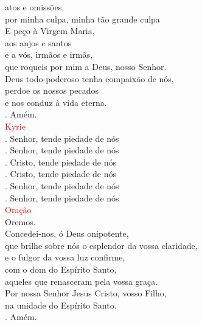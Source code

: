 \documentclass{book}
\begin{document}
\begin{flushleft}
    atos e omissões, \\
    por minha culpa, minha tão grande culpa \\
    E peço à Virgem Maria, \\
    aos anjos e santos \\
    e a vós, irmãos e irmãs, \\
    que roqueis por mim a Deus, nosso Senhor.
    \vspace{0.1cm} \\
    Deus todo-poderoso tenha compaixão de nós, \\
    perdoe os nossos pecados \\
    e nos conduz à vida eterna. \\
    {\color{red} \Rbar.} Amém.
    \vspace{0.2cm} \\
    \textcolor{red}{Kyrie}
    \vspace{0.2cm} \\
    {\color{red} \Vbar.} Senhor, tende piedade de nós \\
    {\color{red} \Rbar.} Senhor, tende piedade de nós
    \vspace{0.1cm} \\
    {\color{red} \Vbar.} Cristo, tende piedade de nós \\
    {\color{red} \Rbar.} Cristo, tende piedade de nós
    \vspace{0.1cm} \\
    {\color{red} \Vbar.} Senhor, tende piedade de nós \\
    {\color{red} \Rbar.} Senhor, tende piedade de nós
    \vspace{0.2cm} \\
    \textcolor{red}{Oração}
    \vspace{0.1cm} \\
    Oremos.
    \vspace{0.1cm}\\
    Concedei-nos, ó Deus onipotente, \\
    que brilhe sobre nós o esplendor da vossa claridade, \\
    e o fulgor da vossa luz confirme, \\
    com o dom do Espírito Santo, \\
    aqueles que renasceram pela vossa graça. \\
    Por nossa Senhor Jesus Cristo, vosso Filho, \\
    na unidade do Espírito Santo. \\
    {\color{red} \Rbar.} Amém. \\


\end{flushleft}
\end{document}
